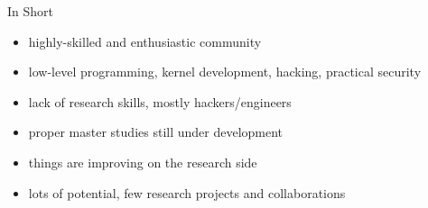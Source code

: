 \documentclass{simple}
\begin{document}
\begin{frame}{In Short}
  \begin{itemize}
    \item highly-skilled and enthusiastic community
    \item low-level programming, kernel development, hacking, practical
      security
    \item lack of research skills, mostly hackers/engineers
    \item proper master studies still under development
    \item things are improving on the research side
    \item lots of potential, few research projects and collaborations
  \end{itemize}
\end{frame}
\end{document}
